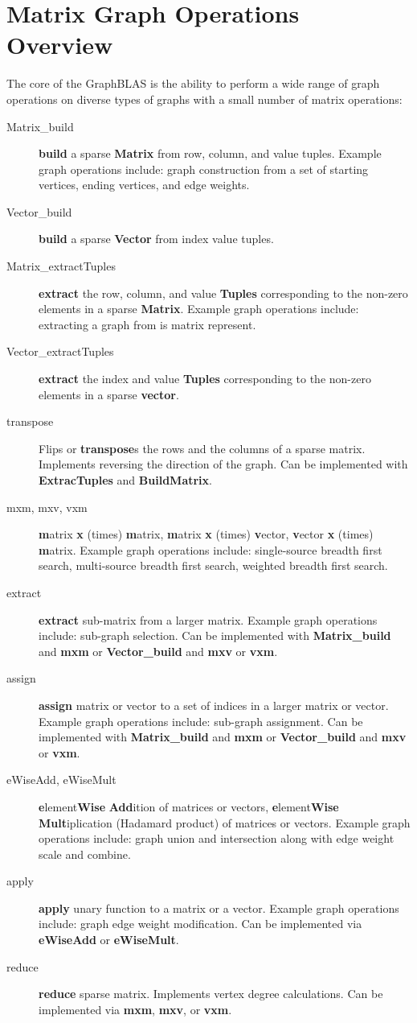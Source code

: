 \section{Matrix Graph Operations Overview}

The core of the GraphBLAS is the ability to perform a wide range of graph operations on diverse types of graphs with a small number of matrix operations:
\begin{description}
\item[Matrix\_build] {\bf build} a sparse {\bf Matrix} from row, column, and value tuples.  Example graph operations include: graph construction from a set of starting vertices, ending vertices, and edge weights.
\item[Vector\_build] {\bf build} a sparse {\bf Vector} from index value tuples.
\item[Matrix\_extractTuples] {\bf extract} the row, column, and value {\bf Tuples} corresponding to the non-zero elements in a sparse {\bf Matrix}.  Example graph operations include: extracting a graph from is matrix represent.
\item[Vector\_extractTuples] {\bf extract} the index and value {\bf Tuples} corresponding to the non-zero elements in a sparse {\bf vector}.
\item[transpose] Flips or {\bf transpose}s the rows and the columns of a sparse matrix.  Implements reversing the direction of the graph.  Can be implemented with  {\bf ExtracTuples} and {\bf BuildMatrix}.
\item[mxm, mxv, vxm] {\bf m}atrix {\bf x} (times) {\bf m}atrix,  {\bf m}atrix {\bf x} (times) {\bf v}ector, {\bf v}ector {\bf x} (times) {\bf m}atrix.   Example graph operations include: single-source breadth first search, multi-source breadth first search, weighted breadth first search.
\item[extract] {\bf extract} sub-matrix from a larger matrix. Example graph operations include: sub-graph selection.  Can be implemented with {\bf Matrix\_build} and {\bf mxm} or {\bf Vector\_build} and {\bf mxv} or {\bf vxm}.
\item[assign] {\bf assign} matrix or vector to a set of indices in a larger matrix or vector.  Example graph operations include: sub-graph assignment.  Can be implemented with {\bf Matrix\_build} and {\bf mxm} or {\bf Vector\_build} and {\bf mxv} or {\bf vxm}.
\item[eWiseAdd, eWiseMult] {\bf e}lement{\bf Wise} {\bf Add}ition of matrices or vectors, {\bf e}lement{\bf Wise} {\bf Mult}iplication (Hadamard product) of matrices  or vectors. Example graph operations include: graph union and intersection along with edge weight scale and combine.
\item[apply] {\bf apply} unary function to a matrix or a vector.  Example graph operations include: graph edge weight modification.  Can be implemented via {\bf eWiseAdd} or {\bf eWiseMult}.
\item[reduce] {\bf reduce} sparse matrix.  Implements vertex degree calculations.  Can be implemented via {\bf mxm}, {\bf mxv}, or {\bf vxm}.
\end{description}
